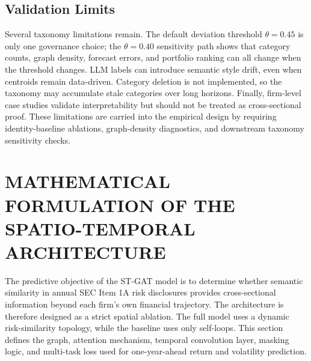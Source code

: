 \documentclass[11pt, a4paper]{article}
\begin{document}
\subsection{Validation Limits}
Several taxonomy limitations remain. The default deviation threshold $\theta=0.45$ is only one governance choice; the $\theta=0.40$ sensitivity path shows that category counts, graph density, forecast errors, and portfolio ranking can all change when the threshold changes. LLM labels can introduce semantic style drift, even when centroids remain data-driven. Category deletion is not implemented, so the taxonomy may accumulate stale categories over long horizons. Finally, firm-level case studies validate interpretability but should not be treated as cross-sectional proof. These limitations are carried into the empirical design by requiring identity-baseline ablations, graph-density diagnostics, and downstream taxonomy sensitivity checks.

\section{MATHEMATICAL FORMULATION OF THE SPATIO-TEMPORAL ARCHITECTURE}
The predictive objective of the ST-GAT model is to determine whether semantic similarity in annual SEC Item 1A risk disclosures provides cross-sectional information beyond each firm's own financial trajectory. The architecture is therefore designed as a strict spatial ablation. The full model uses a dynamic risk-similarity topology, while the baseline uses only self-loops. This section defines the graph, attention mechanism, temporal convolution layer, masking logic, and multi-task loss used for one-year-ahead return and volatility prediction.
\end{document}
